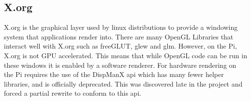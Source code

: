 \subsection{X.org}
X.org is the graphical layer used by linux distributions to provide a windowing system that applications render into.  There are many OpenGL Libraries that interact well with X.org such as freeGLUT, glew and glm.  However, on the Pi, X.org is not GPU accelerated.  This means that while OpenGL code can be run in these windows it is enabled by a software renderer.  For hardware rendering on the Pi requires the use of the DispManX api which has many fewer helper libraries, and is officially deprecated.  This was discovered late in the project and forced a partial rewrite to conform to this api.